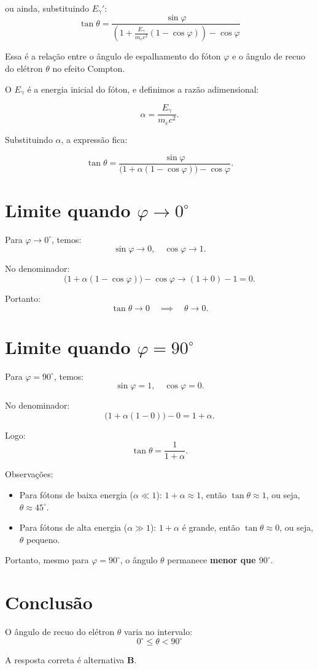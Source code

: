 \begin{flushleft}
ou ainda, substituindo \( E_\gamma' \):
\[
\tan\theta =
\frac{\sin\varphi}{\displaystyle \left( 1 + \frac{E_\gamma}{m_e c^2}(1 - \cos\varphi) \right) - \cos\varphi}
\]

Essa é a relação entre o ângulo de espalhamento do fóton \( \varphi \) e o ângulo de recuo do elétron \( \theta \) no efeito Compton.

O \(E_\gamma\) é a energia inicial do fóton, e definimos a razão adimensional:

\[
\alpha =
\frac{E_\gamma}{m_e c^2}.
\]

Substituindo \(\alpha\), a expressão fica:

\[
\tan\theta =
\frac{\sin\varphi}{
\big(1 + \alpha(1-\cos\varphi)\big) - \cos\varphi}.
\]

\section*{Limite quando \(\varphi \to 0^\circ\)}

Para \(\varphi \to 0^\circ\), temos:
\[
\sin\varphi \to 0, \quad \cos\varphi \to 1.
\]

No denominador:
\[
\big(1 + \alpha(1-\cos\varphi)\big) - \cos\varphi 
\to (1 + 0) - 1 = 0.
\]

Portanto:
\[
\tan\theta \to 0 \quad \implies \quad \theta \to 0.
\]

\section*{Limite quando \(\varphi = 90^\circ\)}

Para \(\varphi = 90^\circ\), temos:
\[
\sin\varphi = 1, \quad \cos\varphi = 0.
\]

No denominador:
\[
\big(1 + \alpha(1-0)\big) - 0 =
1 + \alpha.
\]

Logo:
\[
\tan\theta =
\frac{1}{1+\alpha}.
\]

Observações:
\begin{itemize}
    \item Para fótons de baixa energia (\(\alpha \ll 1\)): \(1+\alpha \approx1\), então \(\tan\theta\approx1\), ou seja, \(\theta\approx45^\circ\).
    \item Para fótons de alta energia (\(\alpha\gg1\)): \(1+\alpha\) é grande, então \(\tan\theta\approx0\), ou seja, \(\theta\) pequeno.
\end{itemize}

Portanto, mesmo para \(\varphi=90^\circ\), o ângulo \(\theta\) permanece \textbf{menor que \(90^\circ\)}.

\section*{Conclusão}

O ângulo de recuo do elétron \(\theta\) varia no intervalo:
\[
\boxed{0^\circ \leq \theta < 90^\circ}
\]


A resposta correta é alternativa \colorbox{green!50}{\textbf{B}}.
\end{flushleft}

